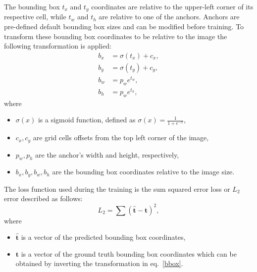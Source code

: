 \documentclass[twoside]{ctuthesis}
\theoremstyle{plain}
\theoremstyle{definition}
\theoremstyle{note}
\begin{document}
The bounding box $t_x$ and $t_y$ coordinates are relative to the upper-left corner of its respective cell, while $t_w$ and $t_h$ are relative to one of the anchors. Anchors are pre-defined default bounding box sizes and can be modified before training. To transform these bounding box coordinates to be relative to the image the following transformation is applied:
\begin{equation}\label{bbox}
	\begin{aligned}
		b_x&=\sigma(t_x)+c_x,\\
		b_y&=\sigma(t_y)+c_y,\\
		b_w&=p_{w}e^{t_w},\\
		b_h&=p_{w}e^{t_h},
	\end{aligned}
\end{equation}
where
\begin{itemize}
	\item $\sigma(x)$ is a sigmoid function, defined as $\sigma(x)=\frac{1}{1+e^{-x}}$,
	\item $c_x, c_y$ are grid cells offsets from the top left corner of the image,
	\item $p_w, p_h$ are the anchor's width and height, respectively,
	\item $b_x, b_y, b_w, b_h$ are the bounding box coordinates relative to the image size.
\end{itemize}
The loss function used during the training is the sum squared error loss or $L_2$ error described as follows:
\begin{equation}
	L_2=\sum(\mathbf{\hat{t}}-\mathbf{t})^2,
\end{equation}
where
\begin{itemize}
	\item $\mathbf{\hat{t}}$ is a vector of the predicted bounding box coordinates,
	\item $\mathbf{t}$ is a vector of the ground truth bounding box coordinates which can be obtained by inverting the transformation in eq.~\eqref{bbox}.
\end{itemize}
\end{document}
